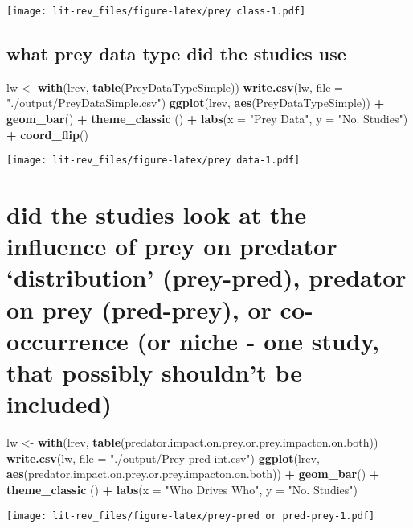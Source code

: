 \documentclass[
]{article}
\newenvironment{Shaded}{\begin{snugshade}}{\end{snugshade}}
\newcommand{\DataTypeTok}[1]{\textcolor[rgb]{0.13,0.29,0.53}{#1}}
\newcommand{\KeywordTok}[1]{\textcolor[rgb]{0.13,0.29,0.53}{\textbf{#1}}}
\newcommand{\NormalTok}[1]{#1}
\newcommand{\OperatorTok}[1]{\textcolor[rgb]{0.81,0.36,0.00}{\textbf{#1}}}
\newcommand{\StringTok}[1]{\textcolor[rgb]{0.31,0.60,0.02}{#1}}
\begin{document}
\texttt{[image: lit-rev\_files/figure-latex/prey class-1.pdf]}

\hypertarget{what-prey-data-type-did-the-studies-use}{%
\subsection{what prey data type did the studies
use}\label{what-prey-data-type-did-the-studies-use}}

\begin{Shaded}
\begin{Highlighting}[]
\NormalTok{lw <-}\StringTok{ }\KeywordTok{with}\NormalTok{(lrev, }\KeywordTok{table}\NormalTok{(PreyDataTypeSimple))}
\KeywordTok{write.csv}\NormalTok{(lw, }\DataTypeTok{file =} \StringTok{"./output/PreyDataSimple.csv"}\NormalTok{)}
\KeywordTok{ggplot}\NormalTok{(lrev, }\KeywordTok{aes}\NormalTok{(PreyDataTypeSimple)) }\OperatorTok{+}\StringTok{ }\KeywordTok{geom_bar}\NormalTok{() }\OperatorTok{+}\StringTok{ }\KeywordTok{theme_classic}\NormalTok{ () }\OperatorTok{+}\StringTok{ }\KeywordTok{labs}\NormalTok{(}\DataTypeTok{x =} \StringTok{"Prey Data"}\NormalTok{, }\DataTypeTok{y =} \StringTok{"No. Studies"}\NormalTok{) }\OperatorTok{+}\StringTok{ }\KeywordTok{coord_flip}\NormalTok{()}
\end{Highlighting}
\end{Shaded}

\texttt{[image: lit-rev\_files/figure-latex/prey data-1.pdf]}

\hypertarget{did-the-studies-look-at-the-influence-of-prey-on-predator-distribution-prey-pred-predator-on-prey-pred-prey-or-co-occurrence-or-niche---one-study-that-possibly-shouldnt-be-included}{%
\section{did the studies look at the influence of prey on predator
`distribution' (prey-pred), predator on prey (pred-prey), or
co-occurrence (or niche - one study, that possibly shouldn't be
included)}\label{did-the-studies-look-at-the-influence-of-prey-on-predator-distribution-prey-pred-predator-on-prey-pred-prey-or-co-occurrence-or-niche---one-study-that-possibly-shouldnt-be-included}}

\begin{Shaded}
\begin{Highlighting}[]
\NormalTok{lw <-}\StringTok{ }\KeywordTok{with}\NormalTok{(lrev, }\KeywordTok{table}\NormalTok{(predator.impact.on.prey.or.prey.impacton.on.both))}
\KeywordTok{write.csv}\NormalTok{(lw, }\DataTypeTok{file =} \StringTok{"./output/Prey-pred-int.csv"}\NormalTok{)}
\KeywordTok{ggplot}\NormalTok{(lrev, }\KeywordTok{aes}\NormalTok{(predator.impact.on.prey.or.prey.impacton.on.both)) }\OperatorTok{+}\StringTok{ }\KeywordTok{geom_bar}\NormalTok{() }\OperatorTok{+}\StringTok{ }\KeywordTok{theme_classic}\NormalTok{ () }\OperatorTok{+}\StringTok{ }\KeywordTok{labs}\NormalTok{(}\DataTypeTok{x =} \StringTok{"Who Drives Who"}\NormalTok{, }\DataTypeTok{y =} \StringTok{"No. Studies"}\NormalTok{)}
\end{Highlighting}
\end{Shaded}

\texttt{[image: lit-rev\_files/figure-latex/prey-pred or pred-prey-1.pdf]}
\end{document}
